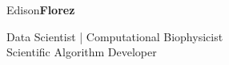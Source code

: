 
\begin{center}
    {\fontsize{60}{40}\selectfont Edison\bf Florez}

    \Large{
        Data Scientist | Computational Biophysicist \\
        Scientific Algorithm Developer
    }
\end{center}

